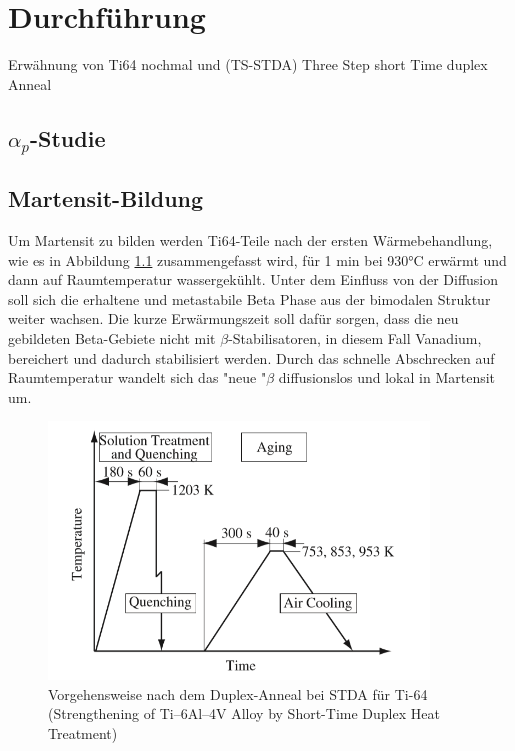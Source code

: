\chapter{Durchführung}


Erwähnung von Ti64 nochmal und (TS-STDA) Three Step short Time duplex Anneal
\section{$\alpha_p$-Studie}




\section{Martensit-Bildung}


Um Martensit zu bilden werden Ti64-Teile  nach der ersten Wärmebehandlung, wie es in Abbildung \ref{STDA} zusammengefasst wird, für 1 min  bei 930°C erwärmt und dann  auf Raumtemperatur wassergekühlt. Unter dem Einfluss von der Diffusion soll sich die erhaltene und metastabile Beta Phase aus der bimodalen Struktur weiter wachsen. Die kurze Erwärmungszeit soll dafür sorgen, dass die neu gebildeten Beta-Gebiete nicht mit $\beta$-Stabilisatoren, in diesem Fall Vanadium, bereichert  und dadurch stabilisiert werden. Durch das schnelle Abschrecken auf Raumtemperatur wandelt sich das "neue "$\beta$ diffusionslos und lokal in Martensit um. 

\begin{figure}[H]
	\centering
	\includegraphics[width=0.9\textwidth]{Bilder/ts-stda}
	\caption{Vorgehensweise nach dem Duplex-Anneal bei STDA für Ti-64 (Strengthening of Ti–6Al–4V Alloy by Short-Time Duplex Heat Treatment)}
	\label{STDA}
\end{figure}

